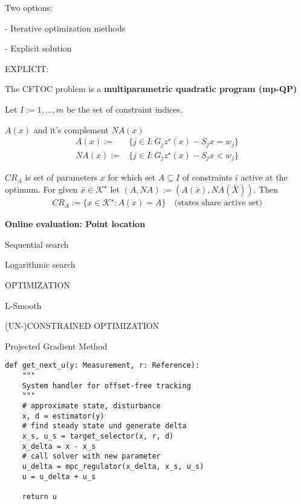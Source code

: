 Two options:

- Iterative optimization methods

- Explicit solution

EXPLICIT:

The CFTOC problem is a
\textbf{multiparametric quadratic program (mp-QP)}



Let $I := {1, . . . , m}$ be the set of constraint indices.
\begin{definition}
	$A(x)$ and it's complement $NA(x)$
	\begin{align*}
		A(x) :=  & \{j\in I: G_jz^\star(x) - S_jx = w_j \} \\
		NA(x) := & \{j\in I: G_jz^\star(x) - S_jx < w_j \}
	\end{align*}
\end{definition}

\begin{definition}
	$CR_A$ is set of parameters $x$ for which set $A\subseteq I$ of constraints $i$ active at the optimum.
	For given $\bar{x} \in \mathcal{K}^\star$ let $(A,NA) := (A(\bar{x}), NA(\bar{X}))$. Then
	\begin{align*}
		CR_A := \{x\in\mathcal{K}^\star : A(x) = A\} \quad \text{(states share active set)}
	\end{align*}
\end{definition}

\textbf{Online evaluation: Point location}

Sequential search

Logarithmic search

OPTIMIZATION


L-Smooth

(UN-)CONSTRAINED OPTIMIZATION

Projected Gradient Method %

\begin{adjustbox}{rndcorners=0.5mm}
	\begin{lstlisting}[style=sst]
def get_next_u(y: Measurement, r: Reference):
    """
    System handler for offset-free tracking
    """
    # approximate state, disturbance
    x, d = estimator(y)
    # find steady state und generate delta
    x_s, u_s = target_selector(x, r, d)
    x_delta = x - x_s
    # call solver with new parameter
    u_delta = mpc_regulator(x_delta, x_s, u_s)
    u = u_delta + u_s

    return u
\end{lstlisting}

\end{adjustbox}
